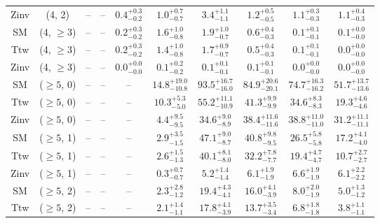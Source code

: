 \begin{table}[h!]
{\begin{tabular}{cccccccccc}
	Zinv & (4, 2) & -- & -- & $0.4^{+ 0.3 }_{- 0.2 }$ & $1.0^{+ 0.7 }_{- 0.7 }$ & $3.4^{+ 1.1 }_{- 1.1 }$ & $1.2^{+ 0.5 }_{- 0.5 }$ & $1.1^{+ 0.3 }_{- 0.3 }$ & $1.1^{+ 0.4 }_{- 0.3 }$ \\[0.5ex] 
	SM & (4, $\ge3$) & -- & -- & $0.2^{+ 0.3 }_{- 0.2 }$ & $1.6^{+ 1.0 }_{- 0.8 }$ & $1.9^{+ 1.0 }_{- 0.7 }$ & $0.6^{+ 0.4 }_{- 0.3 }$ & $0.1^{+ 0.1 }_{- 0.1 }$ & $0.1^{+ 0.0 }_{- 0.0 }$ \\[0.5ex] 
	Ttw & (4, $\ge3$) & -- & -- & $0.2^{+ 0.3 }_{- 0.2 }$ & $1.4^{+ 1.0 }_{- 0.8 }$ & $1.7^{+ 0.9 }_{- 0.7 }$ & $0.5^{+ 0.4 }_{- 0.3 }$ & $0.1^{+ 0.1 }_{- 0.1 }$ & $0.0^{+ 0.0 }_{- 0.0 }$ \\[0.5ex] 
	Zinv & (4, $\ge3$) & -- & -- & $0.0^{+ 0.0 }_{- 0.0 }$ & $0.1^{+ 0.2 }_{- 0.2 }$ & $0.1^{+ 0.1 }_{- 0.1 }$ & $0.1^{+ 0.1 }_{- 0.1 }$ & $0.0^{+ 0.0 }_{- 0.0 }$ & $0.0^{+ 0.0 }_{- 0.0 }$ \\[0.5ex] 
	SM & ($\ge5$, 0) & -- & -- & -- & $14.8^{+ 19.0 }_{- 10.8 }$ & $93.5^{+ 16.7 }_{- 16.0 }$ & $84.9^{+ 20.6 }_{- 20.1 }$ & $74.7^{+ 16.3 }_{- 16.2 }$ & $51.7^{+ 13.7 }_{- 13.6 }$ \\[0.5ex] 
	Ttw & ($\ge5$, 0) & -- & -- & -- & $10.3^{+ 5.3 }_{- 5.0 }$ & $55.2^{+ 11.1 }_{- 10.9 }$ & $41.3^{+ 9.9 }_{- 9.9 }$ & $34.6^{+ 8.3 }_{- 8.3 }$ & $19.3^{+ 4.6 }_{- 4.6 }$ \\[0.5ex] 
	Zinv & ($\ge5$, 0) & -- & -- & -- & $4.4^{+ 9.5 }_{- 9.5 }$ & $34.6^{+ 9.0 }_{- 8.9 }$ & $38.4^{+ 11.6 }_{- 11.6 }$ & $38.8^{+ 11.0 }_{- 11.0 }$ & $31.2^{+ 11.1 }_{- 11.1 }$ \\[0.5ex] 
	SM & ($\ge5$, 1) & -- & -- & -- & $2.9^{+ 3.5 }_{- 1.5 }$ & $47.1^{+ 9.0 }_{- 8.7 }$ & $40.8^{+ 9.8 }_{- 9.5 }$ & $26.5^{+ 5.8 }_{- 5.8 }$ & $17.2^{+ 4.1 }_{- 4.0 }$ \\[0.5ex] 
	Ttw & ($\ge5$, 1) & -- & -- & -- & $2.6^{+ 1.5 }_{- 1.3 }$ & $40.1^{+ 8.1 }_{- 8.0 }$ & $32.2^{+ 7.8 }_{- 7.7 }$ & $19.4^{+ 4.7 }_{- 4.7 }$ & $10.7^{+ 2.7 }_{- 2.7 }$ \\[0.5ex] 
	Zinv & ($\ge5$, 1) & -- & -- & -- & $0.3^{+ 0.7 }_{- 0.7 }$ & $5.2^{+ 1.4 }_{- 1.4 }$ & $6.1^{+ 1.9 }_{- 1.9 }$ & $6.6^{+ 1.9 }_{- 1.9 }$ & $6.1^{+ 2.2 }_{- 2.2 }$ \\[0.5ex] 
	SM & ($\ge5$, 2) & -- & -- & -- & $2.3^{+ 2.8 }_{- 1.2 }$ & $19.4^{+ 4.3 }_{- 4.1 }$ & $16.0^{+ 4.1 }_{- 3.9 }$ & $8.0^{+ 2.0 }_{- 1.9 }$ & $5.0^{+ 1.3 }_{- 1.2 }$ \\[0.5ex] 
	Ttw & ($\ge5$, 2) & -- & -- & -- & $2.1^{+ 1.4 }_{- 1.1 }$ & $17.8^{+ 4.1 }_{- 3.9 }$ & $13.7^{+ 3.5 }_{- 3.4 }$ & $6.8^{+ 1.8 }_{- 1.8 }$ & $3.8^{+ 1.1 }_{- 1.1 }$ \\[0.5ex] 

\end{tabular}}
\end{table}
